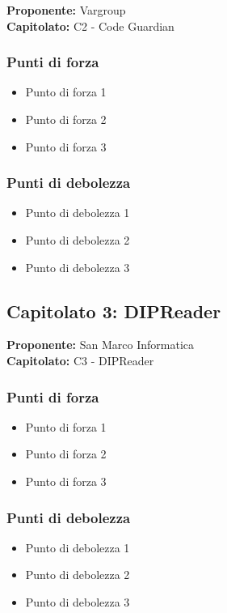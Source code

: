 \documentclass[a4paper,12pt]{article}
\begin{document}
\begin{tcolorbox}[colback=lightgray!30,colframe=darkgray,arc=2mm,boxrule=0.3pt]
\textbf{Proponente:} Vargroup \\
\textbf{Capitolato:} C2 - Code Guardian
\end{tcolorbox}

\subsubsection{Punti di forza}
\begin{itemize}
\item Punto di forza 1
\item Punto di forza 2
\item Punto di forza 3
\end{itemize}

\subsubsection{Punti di debolezza}
\begin{itemize}
\item Punto di debolezza 1
\item Punto di debolezza 2
\item Punto di debolezza 3
\end{itemize}

\subsection{Capitolato 3: DIPReader}

\begin{tcolorbox}[colback=lightgray!30,colframe=darkgray,arc=2mm,boxrule=0.3pt]
\textbf{Proponente:} San Marco Informatica \\
\textbf{Capitolato:} C3 - DIPReader
\end{tcolorbox}

\subsubsection{Punti di forza}
\begin{itemize}
\item Punto di forza 1
\item Punto di forza 2
\item Punto di forza 3
\end{itemize}

\subsubsection{Punti di debolezza}
\begin{itemize}
\item Punto di debolezza 1
\item Punto di debolezza 2
\item Punto di debolezza 3
\end{itemize}
\end{document}
